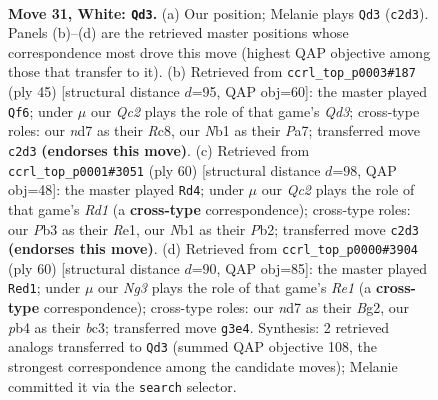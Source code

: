\documentclass[11pt]{article}
\begin{document}
\clearpage

\begin{figure}[p]\centering
\begin{subfigure}{0.46\textwidth}\centering
\resizebox{\linewidth}{!}{%
\newchessgame
\chessboard[
  setfen={1rb3k1/p2n1r1p/5b2/2p5/Pp1p1P2/1P4N1/R1Q1P1q1/1NB1K2R w - - 8 31},
  showmover=false,
  pgfstyle=straightmove, color=movearrow, markmove={c2-d3}
]}
\caption{}
\end{subfigure}\hfill
\begin{subfigure}{0.46\textwidth}\centering
\resizebox{\linewidth}{!}{%
\newchessgame
\chessboard[
  setfen={2r2rk1/pp1bpp2/3q2pQ/n2P3p/2PN4/7P/4BPP1/2R1R1K1 b - - 0 23},
  showmover=false,
  pgfstyle=straightmove, color=movearrow, markmove={d6-f6}
]}
\caption{}
\end{subfigure}
\\[4pt]
\begin{subfigure}{0.46\textwidth}\centering
\resizebox{\linewidth}{!}{%
\newchessgame
\chessboard[
  setfen={3r1r1k/1p1b2pp/4pn2/p1qpN3/P7/2P3QP/1PB3P1/3RR2K w - - 4 31},
  showmover=false,
  pgfstyle=straightmove, color=movearrow, markmove={d1-d4}
]}
\caption{}
\end{subfigure}\hfill
\begin{subfigure}{0.46\textwidth}\centering
\resizebox{\linewidth}{!}{%
\newchessgame
\chessboard[
  setfen={r3r1k1/5p2/2P1p1p1/p6n/1p4NP/1Pb2Q2/P2q1PB1/2R1R1K1 w - - 1 31},
  showmover=false,
  pgfstyle=straightmove, color=movearrow, markmove={e1-d1}
]}
\caption{}
\end{subfigure}
\caption{\textbf{Move 31, White: \texttt{Qd3}.} (a) Our position; Melanie plays \texttt{Qd3} (\texttt{c2d3}). Panels (b)--(d) are the retrieved master positions whose correspondence most drove this move (highest QAP objective among those that transfer to it). (b) Retrieved from \texttt{ccrl\_top\_p0003\#187} (ply 45) [structural distance $d$=95, QAP obj=60]: the master played \texttt{Qf6}; under $\mu$ our \emph{Qc2} plays the role of that game's \emph{Qd3}; cross-type roles: our \emph{n}d7 as their \emph{R}c8, our \emph{N}b1 as their \emph{P}a7; transferred move \texttt{c2d3} \textbf{(endorses this move)}. (c) Retrieved from \texttt{ccrl\_top\_p0001\#3051} (ply 60) [structural distance $d$=98, QAP obj=48]: the master played \texttt{Rd4}; under $\mu$ our \emph{Qc2} plays the role of that game's \emph{Rd1} (a \textbf{cross-type} correspondence); cross-type roles: our \emph{P}b3 as their \emph{R}e1, our \emph{N}b1 as their \emph{P}b2; transferred move \texttt{c2d3} \textbf{(endorses this move)}. (d) Retrieved from \texttt{ccrl\_top\_p0000\#3904} (ply 60) [structural distance $d$=90, QAP obj=85]: the master played \texttt{Red1}; under $\mu$ our \emph{Ng3} plays the role of that game's \emph{Re1} (a \textbf{cross-type} correspondence); cross-type roles: our \emph{n}d7 as their \emph{B}g2, our \emph{p}b4 as their \emph{b}c3; transferred move \texttt{g3e4}. Synthesis: 2 retrieved analogs transferred to \texttt{Qd3} (summed QAP objective 108, the strongest correspondence among the candidate moves); Melanie committed it via the \texttt{search} selector.}
\label{fig:thought-m60}
\end{figure}
\end{document}
